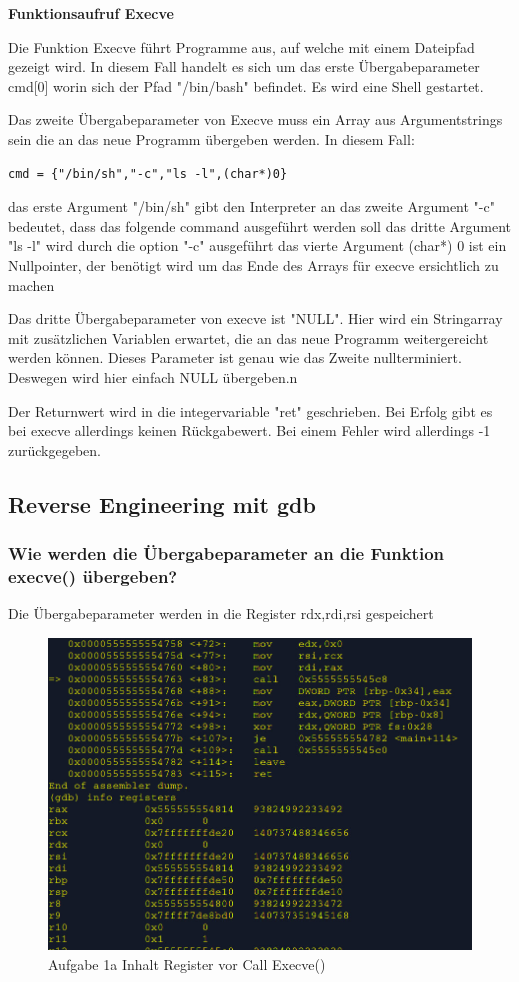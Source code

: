 \documentclass[12pt]{article}
\begin{document}
\textbf{Funktionsaufruf Execve}

Die Funktion Execve führt Programme aus, auf welche mit einem Dateipfad gezeigt wird.
In diesem Fall handelt es sich um das erste Übergabeparameter cmd[0]
worin sich der Pfad "/bin/bash" befindet. Es wird eine Shell gestartet.


Das zweite Übergabeparameter von Execve muss ein Array aus Argumentstrings sein
die an das neue Programm übergeben werden. In diesem Fall:

\begin{lstlisting}
cmd = {"/bin/sh","-c","ls -l",(char*)0}
\end{lstlisting}
das erste Argument "/bin/sh" gibt den Interpreter  an
das zweite Argument "-c" bedeutet, dass das folgende command ausgeführt werden soll
das dritte Argument "ls -l" wird durch die option "-c" ausgeführt
das vierte Argument (char*) 0 ist ein Nullpointer, der benötigt wird
um das Ende des Arrays für execve ersichtlich zu machen

Das dritte Übergabeparameter von execve ist "NULL".
Hier wird ein Stringarray mit zusätzlichen Variablen erwartet, die an
das neue Programm weitergereicht werden können.
Dieses Parameter ist genau wie das Zweite nullterminiert.
Deswegen wird hier einfach NULL übergeben.n


Der Returnwert wird in die integervariable "ret" geschrieben.
Bei Erfolg gibt es bei  execve allerdings keinen Rückgabewert.
Bei einem Fehler wird allerdings -1 zurückgegeben.
\newpage
\subsection{Reverse Engineering mit gdb}

\subsubsection{Wie werden die Übergabeparameter an die Funktion execve()
übergeben?}
Die Übergabeparameter werden in die Register 
rdx,rdi,rsi gespeichert

\begin{figure}[h!]
	\includegraphics[width=15cm]{../images/Bufferoverflow_Aufgabe1a_Reg_b4_call.jpg}
	\caption{Aufgabe 1a Inhalt Register vor Call Execve()}
\end{figure}
\end{document}
